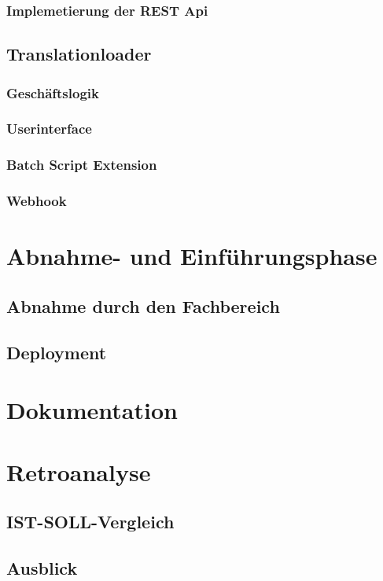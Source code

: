 \documentclass[oneside]{article}
\begin{document}
  \subsubsection{Implemetierung der REST Api}
  \subsection{Translationloader}
  \subsubsection{Geschäftslogik}
  \subsubsection{Userinterface}
  \subsubsection{Batch Script Extension}
  \subsubsection{Webhook}
  \section{Abnahme- und Einführungsphase}
  \subsection{Abnahme durch den Fachbereich}
  \subsection{Deployment}
  \section{Dokumentation}
  \section{Retroanalyse}
  \subsection{IST-SOLL-Vergleich}
  \subsection{Ausblick}
\end{document}
